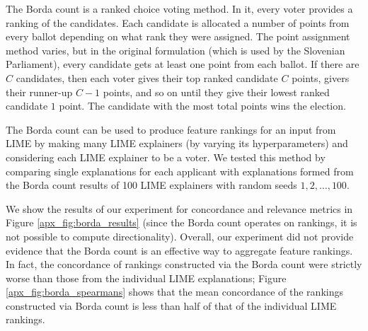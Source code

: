 \documentclass[12pt]{article}  %
\begin{document}
            The Borda count is a ranked choice voting method. In it, every voter provides a ranking of the candidates. Each candidate is allocated a number of points from every ballot depending on what rank they were assigned. The point assignment method varies, but in the original formulation (which is used by the Slovenian Parliament), every candidate gets at least one point from each ballot. If there are $C$ candidates, then each voter gives their top ranked candidate $C$ points, givers their runner-up $C-1$ points, and so on until they give their lowest ranked candidate $1$ point. The candidate with the most total points wins the election.

            The Borda count can be used to produce feature rankings for an input from LIME by making many LIME explainers (by varying its hyperparameters) and considering each LIME explainer to be a voter. We tested this method by comparing single explanations for each applicant with explanations formed from the Borda count results of 100 LIME explainers with random seeds $1,2,\ldots,100$.
            
             We show the results of our experiment for concordance and relevance metrics in Figure \ref{apx_fig:borda_results} (since the Borda count operates on rankings, it is not possible to compute directionality). Overall, our experiment did not provide evidence that the Borda count is an effective way to aggregate feature rankings. In fact, the concordance of rankings constructed via the Borda count were strictly worse than those from the individual LIME explanations; Figure \ref{apx_fig:borda_spearmans} shows that the mean concordance of the rankings constructed via Borda count is less than half of that of the individual LIME rankings.
\end{document}
